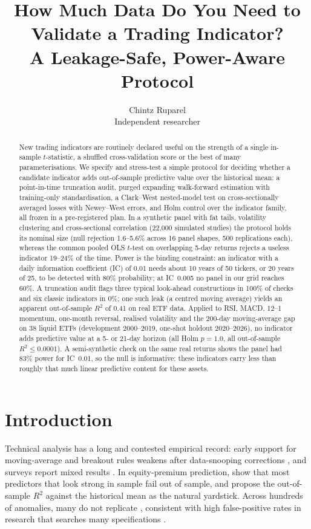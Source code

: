 \documentclass[11pt]{article}
\title{How Much Data Do You Need to Validate a Trading Indicator?\\A Leakage-Safe, Power-Aware Protocol}
\author{Chintz Ruparel\\ Independent researcher}%
\date{}
\begin{document}
\sloppy
\maketitle
\begin{abstract}
New trading indicators are routinely declared useful on the strength of a single in-sample $t$-statistic, a shuffled cross-validation score or the best of many parameterisations. We specify and stress-test a simple protocol for deciding whether a candidate indicator adds out-of-sample predictive value over the historical mean: a point-in-time truncation audit, purged expanding walk-forward estimation with training-only standardisation, a Clark--West nested-model test on cross-sectionally averaged losses with Newey--West errors, and Holm control over the indicator family, all frozen in a pre-registered plan. In a synthetic panel with fat tails, volatility clustering and cross-sectional correlation (22{,}000 simulated studies) the protocol holds its nominal size (null rejection 1.6--5.6\% across 16 panel shapes, 500 replications each), whereas the common pooled OLS $t$-test on overlapping 5-day returns rejects a useless indicator 19--24\% of the time. Power is the binding constraint: an indicator with a daily information coefficient (IC) of 0.01 needs about 10 years of 50 tickers, or 20 years of 25, to be detected with 80\% probability; at IC~0.005 no panel in our grid reaches 60\%. A truncation audit flags three typical look-ahead constructions in 100\% of checks and six classic indicators in 0\%; one such leak (a centred moving average) yields an apparent out-of-sample $R^2$ of 0.41 on real ETF data. Applied to RSI, MACD, 12--1 momentum, one-month reversal, realised volatility and the 200-day moving-average gap on 38 liquid ETFs (development 2000--2019, one-shot holdout 2020--2026), no indicator adds predictive value at a 5- or 21-day horizon (all Holm $p=1.0$, all out-of-sample $R^2\le 0.0001$). A semi-synthetic check on the same real returns shows the panel had 83\% power for IC~0.01, so the null is informative: these indicators carry less than roughly that much linear predictive content for these assets.
\end{abstract}

\section{Introduction}
Technical analysis has a long and contested empirical record: early support for moving-average and breakout rules \citep{brock1992} weakens after data-snooping corrections \citep{sullivan1999}, and surveys report mixed results \citep{park2007}. In equity-premium prediction, \citet{welch2008} show that most predictors that look strong in sample fail out of sample, and \citet{campbell2008} propose the out-of-sample $R^2$ against the historical mean as the natural yardstick. Across hundreds of anomalies, many do not replicate \citep{hou2020}, consistent with high false-positive rates in research that searches many specifications \citep{harvey2015,bailey2014,ioannidis2005}.
\end{document}
